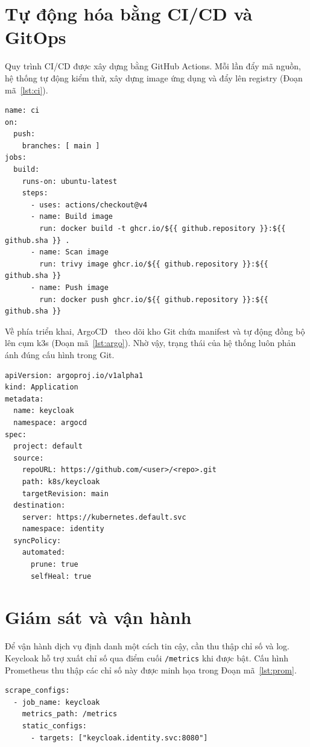 \section{Tự động hóa bằng CI/CD và GitOps}
\label{sec:cicd}

Quy trình CI/CD được xây dựng bằng GitHub Actions. Mỗi lần đẩy mã nguồn, hệ
thống tự động kiểm thử, xây dựng image ứng dụng và đẩy lên registry
(Đoạn mã~\ref{lst:ci}).

\begin{lstlisting}[caption={Trích quy trình CI bằng GitHub Actions},label={lst:ci}]
name: ci
on:
  push:
    branches: [ main ]
jobs:
  build:
    runs-on: ubuntu-latest
    steps:
      - uses: actions/checkout@v4
      - name: Build image
        run: docker build -t ghcr.io/${{ github.repository }}:${{ github.sha }} .
      - name: Scan image
        run: trivy image ghcr.io/${{ github.repository }}:${{ github.sha }}
      - name: Push image
        run: docker push ghcr.io/${{ github.repository }}:${{ github.sha }}
\end{lstlisting}

Về phía triển khai, ArgoCD~\cite{argocd} theo dõi kho Git chứa manifest và tự
động đồng bộ lên cụm k3s (Đoạn mã~\ref{lst:argo}). Nhờ vậy, trạng thái của hệ
thống luôn phản ánh đúng cấu hình trong Git.

\begin{lstlisting}[caption={Khai báo ứng dụng ArgoCD},label={lst:argo}]
apiVersion: argoproj.io/v1alpha1
kind: Application
metadata:
  name: keycloak
  namespace: argocd
spec:
  project: default
  source:
    repoURL: https://github.com/<user>/<repo>.git
    path: k8s/keycloak
    targetRevision: main
  destination:
    server: https://kubernetes.default.svc
    namespace: identity
  syncPolicy:
    automated:
      prune: true
      selfHeal: true
\end{lstlisting}

\section{Giám sát và vận hành}
\label{sec:giamsat}

Để vận hành dịch vụ định danh một cách tin cậy, cần thu thập chỉ số và log.
Keycloak hỗ trợ xuất chỉ số qua điểm cuối \texttt{/metrics} khi được bật. Cấu
hình Prometheus thu thập các chỉ số này được minh họa trong
Đoạn mã~\ref{lst:prom}.

\begin{lstlisting}[caption={Cấu hình Prometheus thu thập chỉ số Keycloak},label={lst:prom}]
scrape_configs:
  - job_name: keycloak
    metrics_path: /metrics
    static_configs:
      - targets: ["keycloak.identity.svc:8080"]
\end{lstlisting}

